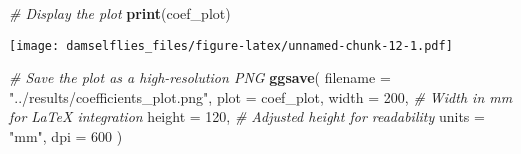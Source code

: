 \documentclass[
]{article}
\newenvironment{Shaded}{\begin{snugshade}}{\end{snugshade}}
\newcommand{\AttributeTok}[1]{\textcolor[rgb]{0.13,0.29,0.53}{#1}}
\newcommand{\CommentTok}[1]{\textcolor[rgb]{0.56,0.35,0.01}{\textit{#1}}}
\newcommand{\DecValTok}[1]{\textcolor[rgb]{0.00,0.00,0.81}{#1}}
\newcommand{\FunctionTok}[1]{\textcolor[rgb]{0.13,0.29,0.53}{\textbf{#1}}}
\newcommand{\NormalTok}[1]{#1}
\newcommand{\StringTok}[1]{\textcolor[rgb]{0.31,0.60,0.02}{#1}}
\begin{document}
\begin{Shaded}
\begin{Highlighting}[]
\CommentTok{\# Display the plot}
\FunctionTok{print}\NormalTok{(coef\_plot)}
\end{Highlighting}
\end{Shaded}

\texttt{[image: damselflies\_files/figure-latex/unnamed-chunk-12-1.pdf]}

\begin{Shaded}
\begin{Highlighting}[]
\CommentTok{\# Save the plot as a high{-}resolution PNG}
\FunctionTok{ggsave}\NormalTok{(}
  \AttributeTok{filename =} \StringTok{"../results/coefficients\_plot.png"}\NormalTok{, }
  \AttributeTok{plot =}\NormalTok{ coef\_plot, }
  \AttributeTok{width =} \DecValTok{200}\NormalTok{,  }\CommentTok{\# Width in mm for LaTeX integration}
  \AttributeTok{height =} \DecValTok{120}\NormalTok{, }\CommentTok{\# Adjusted height for readability}
  \AttributeTok{units =} \StringTok{"mm"}\NormalTok{,}
  \AttributeTok{dpi =} \DecValTok{600}
\NormalTok{)}
\end{Highlighting}
\end{Shaded}
\end{document}
